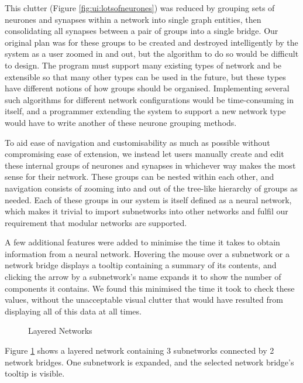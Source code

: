 \documentclass{acm_proc_article-sp}
\begin{document}
{This clutter (Figure \ref{fig:ui:lotsofneurones}) was reduced by grouping sets of neurones and synapses within a network into single graph entities, then consolidating all synapses between a pair of groups into a single bridge. Our original plan was for these groups to be created and destroyed intelligently by the system as a user zoomed in and out, but the algorithm to do so would be difficult to design. The program must support many existing types of network and be extensible so that many other types can be used in the future, but these types have different notions of how groups should be organised. Implementing several such algorithms for different network configurations would be time-consuming in itself, and a programmer extending the system to support a new network type would have to write another of these neurone grouping methods.

To aid ease of navigation and customisability as much as possible without compromising ease of extension, we instead let users manually create and edit these internal groups of neurones and synapses in whichever way makes the most sense for their network. These groups can be nested within each other, and navigation consists of zooming into and out of the tree-like hierarchy of groups as needed. Each of these groups in our system is itself defined as a neural network, which makes it trivial to import subnetworks into other networks and fulfil our requirement that modular networks are supported.

A few additional features were added to minimise the time it takes to obtain information from a neural network. Hovering the mouse over a subnetwork or a network bridge displays a tooltip containing a summary of its contents, and clicking the arrow by a subnetwork's name expands it to show the number of components it contains. We found this minimised the time it took to check these values, without the unacceptable visual clutter that would have resulted from displaying all of this data at all times.

\begin{figure}[t]
\centering
{}
\caption{Layered Networks}
\label{fig:ui:layered}
\end{figure}
Figure \ref{fig:ui:layered} shows a layered network containing 3 subnetworks connected by 2 network bridges. One subnetwork is expanded, and the selected network bridge's tooltip is visible.

}
\end{document}
